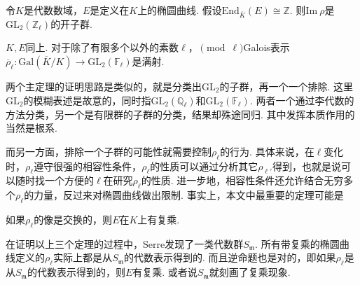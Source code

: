 \begin{cthm}
    令$K$是代数数域，$E$是定义在$K$上的椭圆曲线. 假设$\mathrm{End}_{\overline{K}}(E) \cong \mathbb{Z}$. 则$\mathrm{Im}\ \rho$是$\mathrm{GL}_2(\mathbb{Z}_{\ell})$的开子群. \label{main::open_image}
\end{cthm}

\begin{cthm}
    $K, E$同上. 对于除了有限多个以外的素数$\ell$，$\pmod{\ell}$Galois表示$\overline{\rho}_{\ell}: \mathrm{Gal}(\overline{K}/K)\to \mathrm{GL}_2(\mathbb{F}_{\ell})$是满射.
\end{cthm}

两个主定理的证明思路是类似的，就是分类出$\mathrm{GL}_2$的子群，再一个一个排除. 这里$\mathrm{GL}_2$的模糊表述是故意的，同时指$\mathrm{GL}_2(\mathbb{Q}_{\ell})$和$\mathrm{GL}_2(\mathbb{F}_{\ell})$. 两者一个通过李代数的方法分类，另一个是有限群的子群的分类，结果却殊途同归. 其中发挥本质作用的当然是根系.

而另一方面，排除一个子群的可能性就需要控制$\rho_{\ell}$的行为. 具体来说，在$\ell$变化时，$\rho_{\ell}$遵守很强的相容性条件，$\rho_{\ell}$的性质可以通过分析其它$\rho_{\ell'}$得到，也就是说可以随时找一个方便的$\ell$在研究$\rho_{\ell}$的性质. 进一步地，相容性条件还允许结合无穷多个$\rho_{\ell}$的力量，反过来对椭圆曲线做出限制. 事实上，本文中最重要的定理可能是

\begin{cthm}
    如果$\rho_{\ell}$的像是交换的，则$E$在$K$上有复乘.
\end{cthm}

在证明以上三个定理的过程中，Serre发现了一类代数群$S_{\mathfrak{m}}$. 所有带复乘的椭圆曲线定义的$\rho_{\ell}$实际上都是从$S_{\mathfrak{m}}$的代数表示得到的. 而且逆命题也是对的，即如果$\rho_{\ell}$是从$S_{\mathfrak{m}}$的代数表示得到的，则$E$有复乘. 或者说$S_{\mathfrak{m}}$就刻画了复乘现象.
